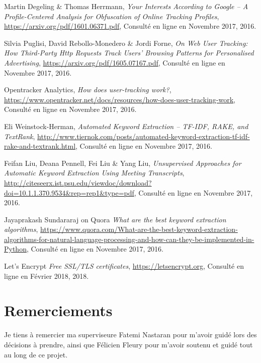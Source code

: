 \begin{thebibliography}{9}
  Martin Degeling \& Thomas Herrmann,
  \emph{Your Interests According to Google – A Profile-Centered Analysis
for Obfuscation of Online Tracking Profiles},
  \url{https://arxiv.org/pdf/1601.06371.pdf},
  Consulté en ligne en Novembre 2017,
  2016.

  Silvia Puglisi, David Rebollo-Monedero \& Jordi Forne,
  \emph{On Web User Tracking: How Third-Party Http
Requests Track Users’ Browsing Patterns for
Personalised Advertising},
  \url{https://arxiv.org/pdf/1605.07167.pdf},
  Consulté en ligne en Novembre 2017,
  2016.

  Opentracker Analytics,
  \emph{How does user-tracking work?},
  \url{https://www.opentracker.net/docs/resources/how-does-user-tracking-work},
  Consulté en ligne en Novembre 2017,
  2016.

  Eli Weinstock-Herman,
  \emph{Automated Keyword Extraction – TF-IDF, RAKE, and TextRank},
  \url{http://www.tiernok.com/posts/automated-keyword-extraction-tf-idf-rake-and-textrank.html},
  Consulté en ligne en Novembre 2017,
  2016.

  Feifan Liu, Deana Pennell, Fei Liu \& Yang Liu,
  \emph{Unsupervised Approaches for Automatic Keyword Extraction Using Meeting Transcripts},
  \url{http://citeseerx.ist.psu.edu/viewdoc/download?doi=10.1.1.370.9534&rep=rep1&type=pdf},
  Consulté en ligne en Novembre 2017,
  2016.

  Jayaprakash Sundararaj on Quora
  \emph{What are the best keyword extraction algorithms},
  \url{https://www.quora.com/What-are-the-best-keyword-extraction-algorithms-for-natural-language-processing-and-how-can-they-be-implemented-in-Python},
  Consulté en ligne en Novembre 2017,
  2016.

  Let's Encrypt
  \emph{Free SSL/TLS certificates},
  \url{https://letsencrypt.org},
  Consulté en ligne en Février 2018,
  2018.



\end{thebibliography}

\printglossary

\chapter*{Remerciements}
Je tiens à remercier ma superviseure Fatemi Nastaran pour m'avoir guidé lors des décisions à prendre, ainsi que Félicien Fleury pour m'avoir soutenu et guidé tout au long de ce projet.

